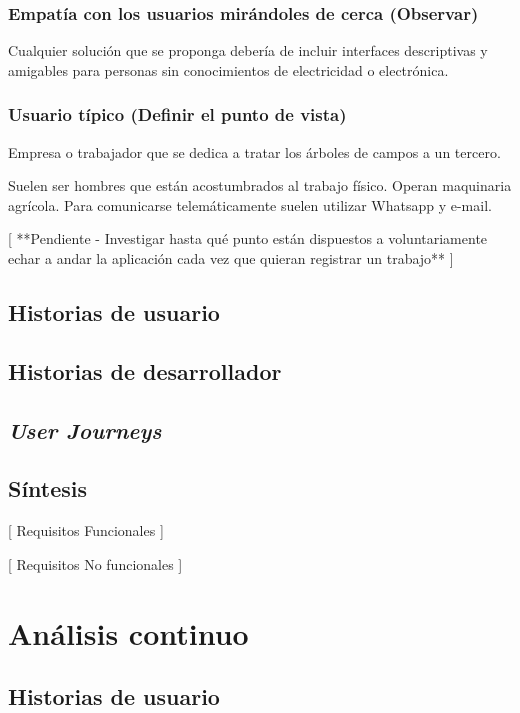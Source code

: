 \subsubsection{Empatía con los usuarios mirándoles de cerca (Observar)}

Cualquier solución que se proponga debería de incluir interfaces
descriptivas y amigables para personas sin conocimientos de
electricidad o electrónica.

\subsubsection{Usuario típico (Definir el punto de vista)}

Empresa o trabajador que se dedica a tratar los árboles de campos a un tercero.

Suelen ser hombres que están acostumbrados al trabajo físico. Operan maquinaria
agrícola. Para comunicarse telemáticamente suelen utilizar Whatsapp y e-mail.

[ **Pendiente - Investigar hasta qué punto están dispuestos a voluntariamente
echar a andar la aplicación cada vez que quieran registrar un trabajo** ]

\subsection{Historias de usuario}

\subsection{Historias de desarrollador}

\subsection{\textit{User Journeys}}

\subsection{Síntesis}

[ Requisitos Funcionales ]

[ Requisitos No funcionales ]

\section{Análisis continuo}

\subsection{Historias de usuario}

